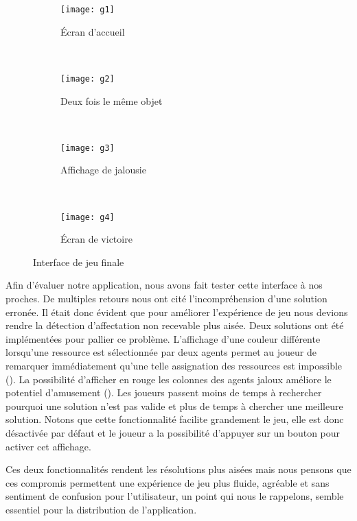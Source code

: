 \documentclass[../main.tex]{subfiles}
\begin{document}
\begin{figure}[ht!]
    \centering
    \begin{subfigure}{0.34\textwidth}
        \centering
        \texttt{[image: g1]}
        \caption{Écran d'accueil}
        \label{fig-finalgameview}
    \end{subfigure}
    ~
    \begin{subfigure}{0.34\textwidth}
        \centering
        \texttt{[image: g2]}
        \caption{Deux fois le même objet}
        \label{fig-twotimes}
    \end{subfigure}
    ~
    \begin{subfigure}{0.34\textwidth}
        \centering
        \texttt{[image: g3]}
        \caption{Affichage de jalousie}
        \label{fig-envy}
    \end{subfigure}
    ~
    \begin{subfigure}{0.34\textwidth}
        \centering
        \texttt{[image: g4]}
        \caption{Écran de victoire}
    \end{subfigure}
    \caption{Interface de jeu finale}
\end{figure}

    Afin d'évaluer notre application, nous avons fait tester cette interface à nos proches. De multiples retours nous ont cité l'incompréhension d'une solution erronée. Il était donc évident que pour améliorer l'expérience de jeu nous devions rendre la détection d'affectation non recevable plus aisée. Deux solutions ont été implémentées pour pallier ce problème. L'affichage d'une couleur différente lorsqu'une ressource est sélectionnée par deux agents permet au joueur de remarquer immédiatement qu'une telle assignation des ressources est impossible (). La possibilité d'afficher en rouge les colonnes des agents jaloux améliore le potentiel d'amusement (). Les joueurs passent moins de temps à rechercher pourquoi une solution n'est pas valide et plus de temps à chercher une meilleure solution. Notons que cette fonctionnalité facilite grandement le jeu, elle est donc désactivée par défaut et le joueur a la possibilité d'appuyer sur un bouton pour activer cet affichage.

    Ces deux fonctionnalités rendent les résolutions plus aisées mais nous pensons que ces compromis permettent une expérience de jeu plus fluide, agréable et sans sentiment de confusion pour l'utilisateur, un point qui nous le rappelons, semble essentiel pour la distribution de l'application. 
	
\end{document}
